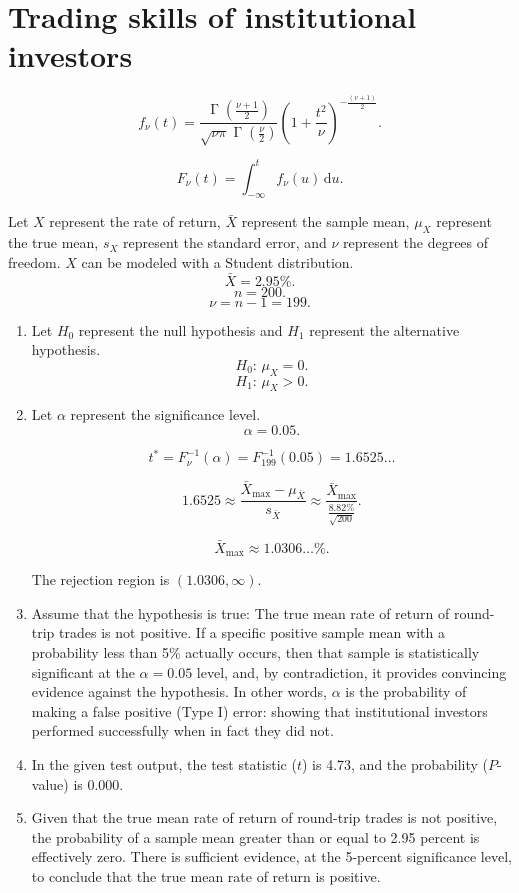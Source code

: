 \documentclass[12pt]{article}
\DeclareMathOperator{\Gammafunction}{\Gamma}
\begin{document}
\section{Trading skills of institutional investors}
\[f_\nu(t)=\frac{\Gammafunction\left(\frac{\nu+1}{2}\right)}{\sqrt{\nu\pi}\Gammafunction\left(\frac{\nu}{2}\right)}\left(1+\frac{t^2}{\nu}\right)^{-\frac{(v+1)}{2}}.\]

\[F_\nu(t)=\int^{t}_{-\infty}{f_\nu(u)\,\mathrm{d}u}.\]

Let $X$ represent the rate of return, $\bar{X}$ represent the sample mean, $\mu_X$ represent the true mean, $s_X$ represent the standard error, and $\nu$ represent the degrees of freedom. $X$ can be modeled with a Student distribution.
\[\bar{X}=2.95\%.\]
\[n=200.\]
\[\nu=n-1=199.\]

\begin{enumerate}
\item Let $H_0$ represent the null hypothesis and $H_1$ represent the alternative hypothesis.
\[H_0:\,\mu_X=0.\]
\[H_1:\,\mu_X>0.\]
\item Let $\alpha$ represent the significance level.
\[\alpha=0.05.\]

\[t^*=F^{-1}_\nu(\alpha)=F^{-1}_{199}(0.05)=1.6525\dots\]

\[1.6525\approx\frac{\bar{X}_{\text{max}}-\mu_{\bar{X}}}{s_{\bar{X}}}\approx\frac{\bar{X}_{\text{max}}}{\frac{8.82\%}{\sqrt{200}}}.\]

\[\bar{X}_{\text{max}}\approx 1.0306\dots\%.\]

The rejection region is $(1.0306,\infty)$.
\item Assume that the hypothesis is true: The true mean rate of return of round-trip trades is not positive. If a specific positive sample mean with a probability less than 5\% actually occurs, then that sample is statistically significant at the $\alpha=0.05$ level, and, by contradiction, it provides convincing evidence against the hypothesis. In other words, $\alpha$ is the probability of making a false positive (Type I) error: showing that institutional investors performed successfully when in fact they did not.
\item In the given test output, the test statistic ($t$) is 4.73, and the probability ($P$-value) is 0.000.
\item Given that the true mean rate of return of round-trip trades is not positive, the probability of a sample mean greater than or equal to 2.95 percent is effectively zero. There is sufficient evidence, at the 5-percent significance level, to conclude that the true mean rate of return is positive.
\end{enumerate}
\end{document}
